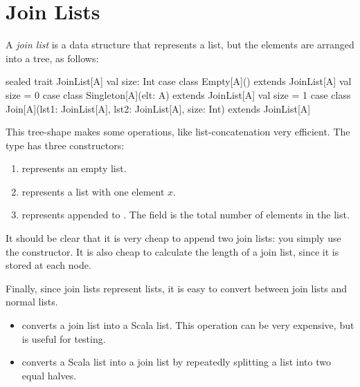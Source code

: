 \section{Join Lists}

A \emph{join list} is a data structure that represents a list, but the
elements are arranged into a tree, as follows:

\begin{scalacode}
sealed trait JoinList[A] { val size: Int }
case class Empty[A]() extends JoinList[A] { val size = 0 }
case class Singleton[A](elt: A) extends JoinList[A] { val size = 1 }
case class Join[A](lst1: JoinList[A], lst2: JoinList[A], size: Int) extends JoinList[A]
\end{scalacode}

This tree-shape makes some operations,
like list-concatenation very efficient.
The type has three constructors:

\begin{enumerate}

\item {} represents an empty list.

\item {} represents a list with one element $x$.

\item {} represents  appended to
       . The  field is the total number of
       elements in the list.

\end{enumerate}

It should be clear that it is very cheap to append two join lists: you simply
use the  constructor. It is also cheap to calculate the length of a
join list, since it is stored at each node.


Finally, since join lists represent lists, it is easy to convert between
join lists and normal lists.
%
\begin{itemize}

\item {} converts a join list into a Scala
  list.  This
  operation can be very expensive, but is useful for testing.

\item {} converts a Scala list into a join
  list by repeatedly splitting a list into two equal halves.

\end{itemize}

